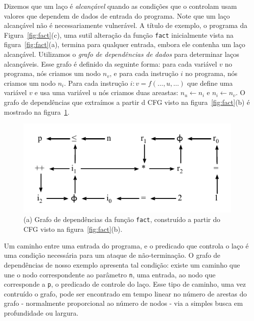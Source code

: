 \documentclass{llncs}
\begin{document}
Dizemos que um laço é {\em alcançável} quando as condições que o controlam
usam valores que dependem de dados de entrada do programa.
Note que um laço alcançável não é necessariamente vulnerável.
A título de exemplo, o programa da Figura~\ref{fig:fact}(c), uma sutil
alteração da função \texttt{fact} inicialmente vista na
figura~\ref{fig:fact}(a), termina para qualquer entrada, embora ele contenha
um laço alcançável.
Utilizamos o {\em grafo de dependências de dados} para determinar laços
alcançáveis.
Esse grafo é definido da seguinte forma:
para cada variável $v$ no programa, nós criamos um nodo $n_v$, e para cada
instrução $i$ no programa, nós criamos um nodo $n_i$.
Para cada instrução $i: v = f(\ldots, u, \ldots)$ que define uma variável $v$ e
usa uma variável $u$ n\'{o}s criamos duas areastas: $n_u \leftarrow n_i$ e
$n_i \leftarrow n_v$.
O grafo de dependências que extraímos a partir d CFG visto na
figura~\ref{fig:fact}(b) é mostrado na figura~\ref{fig:depGraph}.

\begin{figure}[t!]
\begin{center}
\includegraphics{images/depGraph}
\caption{(a) Grafo de dependências da função \texttt{fact}, construído a
partir do CFG visto na figura~\ref{fig:fact}(b).}
\label{fig:depGraph}
\end{center}
\end{figure}

Um caminho entre uma entrada do programa, e o predicado que controla o laço é
uma condição necessária para um ataque de não-terminação.
O grafo de dependências de nosso exemplo apresenta tal condição:
existe um caminho que une o nodo correspondente ao parâmetro \texttt{n}, uma
entrada, ao nodo que corresponde a \texttt{p}, o predicado de controle do
laço.
Esse tipo de caminho, uma vez contruído o grafo, pode ser encontrado em
tempo linear no número de arestas do grafo - normalmente proporcional ao
número de nodos - via a simples busca em profundidade ou largura.
\end{document}
